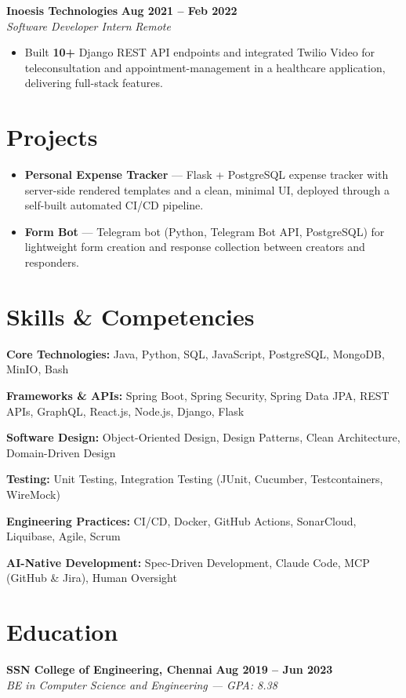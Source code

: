 \documentclass[a4paper,10pt]{article}
\newcommand{\jobentry}[4]{%
  \vspace{6pt}
  \noindent\textbf{#1} \hfill \textbf{#4}\\[2pt]
  \textit{#2} \hfill \textit{#3}\par
}
\begin{document}
\jobentry{Inoesis Technologies}{Software Developer Intern}{Remote}{Aug 2021 -- Feb 2022}
\begin{itemize}
    \item Built \textbf{10+} Django REST API endpoints and integrated Twilio Video for teleconsultation and appointment-management in a healthcare application, delivering full-stack features.
\end{itemize}
\section*{Projects}
\vspace{6pt}
\begin{itemize}
    \item \textbf{Personal Expense Tracker} --- Flask + PostgreSQL expense tracker with server-side rendered templates and a clean, minimal UI, deployed through a self-built automated CI/CD pipeline.
    \item \textbf{Form Bot} --- Telegram bot (Python, Telegram Bot API, PostgreSQL) for lightweight form creation and response collection between creators and responders.
\end{itemize}
\section*{Skills \& Competencies}
\vspace{6pt}
\noindent\textbf{Core Technologies:} Java, Python, SQL, JavaScript, PostgreSQL, MongoDB, MinIO, Bash\par\vspace{3pt}
\noindent\textbf{Frameworks \& APIs:} Spring Boot, Spring Security, Spring Data JPA, REST APIs, GraphQL, React.js, Node.js, Django, Flask\par\vspace{3pt}
\noindent\textbf{Software Design:} Object-Oriented Design, Design Patterns, Clean Architecture, Domain-Driven Design\par\vspace{3pt}
\noindent\textbf{Testing:} Unit Testing, Integration Testing (JUnit, Cucumber, Testcontainers, WireMock)\par\vspace{3pt}
\noindent\textbf{Engineering Practices:} CI/CD, Docker, GitHub Actions, SonarCloud, Liquibase, Agile, Scrum\par\vspace{3pt}
\noindent\textbf{AI-Native Development:} Spec-Driven Development, Claude Code, MCP (GitHub \& Jira), Human Oversight\par
\section*{Education}
\jobentry{SSN College of Engineering, Chennai}{BE in Computer Science and Engineering --- GPA: 8.38}{}{Aug 2019 -- Jun 2023}
\end{document}
